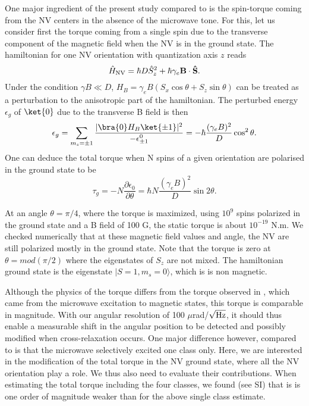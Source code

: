 \documentclass[preprintnumbers,amsmath,amssymb,superscriptaddress,twocolumn,showpacs]{revtex4-1}
\begin{document}
One major ingredient of the present study compared to \cite{DelordNat} is the spin-torque coming from the NV centers in the absence of the microwave tone.
For this, let us consider first the torque coming from a single spin due to the transverse component of the magnetic field when the NV is in the ground state.
The hamiltonian for one NV orientation with quantization axis $z$ reads 
\begin{equation}\hat{H}_{\rm NV}=\hbar D \hat{S}_z^2+ \hbar \gamma_e \bf B  \cdot \bf\hat S.
\end{equation}
Under the condition $\gamma B \ll D$, $H_{B}= \gamma_e B  ( S_x \cos\theta + S_z \sin\theta)$ can be treated as a perturbation to the anisotropic part of the hamiltonian. 
The perturbed energy $\epsilon_g$ of $\ket{0}$ due to the transverse B field is then
\begin{equation} \epsilon_g=\sum_{m_s=\pm 1}\frac{ |\bra{0} H_B \ket{\pm 1}|^2}{-\epsilon^0_{\pm 1}}=-\hbar\frac{(\gamma_e B)^2 }{D} \cos^2\theta.
\end{equation}
One can deduce the total torque when N spins of a given orientation are polarised in the ground state to be 
\begin{equation}\tau_g=-N \frac{\partial \epsilon_0}{\partial \theta}=\hbar N  \frac{(\gamma_e B)^2}{D} \sin 2\theta.\end{equation}

At an angle $\theta=\pi/4$, where the torque is maximized, using $10^9$ spins polarized in the ground state and a B field of 100 G, the static torque is about $10^{-19}$ N.m.
We checked numerically that at these magnetic field values and angle, the NV are still polarized mostly in the ground state. 
Note that the torque is zero at $\theta=mod (\pi/2)$ where the eigenstates of $S_z$ are not mixed. The hamiltonian ground state is the eigenstate $| S=1,m_s=0\rangle$, which is is non magnetic. 

Although the physics of the torque differs from the torque observed in \cite{DelordNat}, which came from the microwave excitation to magnetic states, this torque is comparable in magnitude. With our angular resolution of 100 $\mu$rad/$\sqrt{\rm Hz}$, it should thus enable a measurable shift in the angular position to be detected and possibly modified when cross-relaxation occurs. 
One major difference however, compared to \cite{DelordNat} is that the microwave selectively excited one class only. 
Here, we are interested in the modification of the total torque in the NV ground state, where all the NV orientation play a role. We thus also need to evaluate their contributions.
When estimating the total torque including the four classes, we found (see SI) that is is one order of magnitude weaker than for the above single class estimate.
\end{document}
